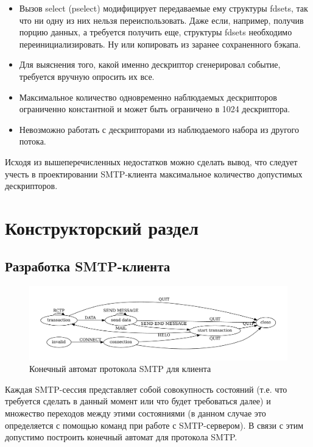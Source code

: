 \documentclass[a4paper,12pt]{report}
\begin{document}
	\begin{itemize}
		\item Вызов select (pselect) модифицирует передаваемые ему структуры fdsets, так что ни одну из них нельзя переиспользовать. Даже если, например, получив порцию данных, а требуется получить еще, структуры fdsets необходимо переинициализировать. Ну или копировать из заранее сохраненного бэкапа.
		\item Для выяснения того, какой именно дескриптор сгенерировал событие, требуется вручную опросить их все.
		\item Максимальное количество одновременно наблюдаемых дескрипторов ограниченно константной и может быть ограничено в 1024 дескриптора.
		\item Невозможно работать с дескрипторами из наблюдаемого набора из другого потока.
	\end{itemize}

	Исходя из вышеперечисленных недостатков можно сделать вывод, что следует учесть в проектировании SMTP-клиента максимальное количество допустимых дескрипторов.

 	\chapter{Конструкторский раздел}

 	\section{Разработка SMTP-клиента}
    
    	\begin{figure}[h]
		\centering
		\includegraphics[width=\textwidth]{./include/smtp_states.pdf}
		\caption{Конечный автомат протокола SMTP для клиента}
		\label{fig:smtp_states}
	\end{figure}
     
	Каждая SMTP-сессия представляет собой совокупность состояний (т.е. что требуется сделать в данный момент или что будет требоваться далее) и множество переходов между этими состояниями (в данном случае это определяется с помощью команд при работе с SMTP-сервером). В связи с этим допустимо построить конечный автомат для протокола SMTP.
\end{document}

